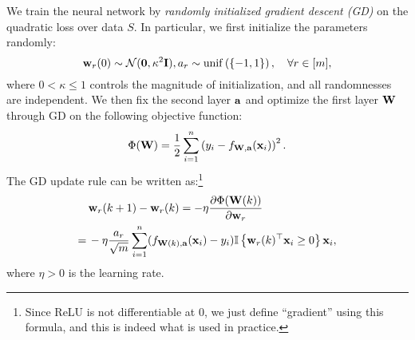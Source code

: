 We train the neural network by \emph{randomly initialized gradient descent (GD)} on the quadratic loss over data $S$.
In particular, we first initialize the parameters randomly:
\begin{equation} \label{eqn:random-init}
\mathbf{w}_r(0) \sim \mathcal{N}(\mathbf{0},\kappa^2\mathbf{I}), a_r \sim \mathrm{unif}\left(\left\{-1,1\right\}\right), \quad \forall r\in[m],
\end{equation} %
where $0<\kappa\le1$ controls the magnitude of initialization, and all randomnesses are independent.
We then fix the second layer $\mathbf{a}$ and optimize the first layer $\mathbf{W}$ through GD on the following objective function:
\begin{equation} \label{eqn:objective-function}
\Phi(\mathbf{W}) = 
\frac{1}{2}\sum_{i=1}^{n}\left(y_i-f_{\mathbf{W}, \mathbf{a}}(\mathbf{x}_i)\right)^2.
\end{equation}
The GD update rule can be written as:\footnote{Since ReLU is not differentiable at $0$, we just define ``gradient'' using this formula, and this is indeed what is used in practice.}
\begin{equation*} \label{eqn:w_r-gd}
\begin{aligned}
&\mathbf{w}_r(k+1) - \mathbf{w}_r(k)  =  -\eta \frac{\partial \Phi(\mathbf{W}(k))}{\partial \mathbf{w}_r} \\
=\,& -\eta  \frac{a_r}{\sqrt m}  \sum_{i=1}^n (f_{\mathbf{W}(k),\mathbf{a}}(\mathbf{x}_i) - y_i) \mathbb{I} \left\{ \mathbf{w}_r(k)^\top \mathbf{x}_i \ge 0 \right\}  \mathbf{x}_i,
\end{aligned}
\end{equation*}
where $\eta>0$ is the learning rate.





